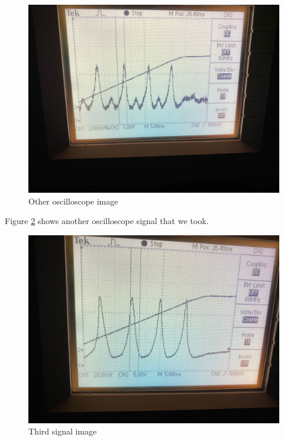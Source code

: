 \documentclass{article}
\begin{document}
\begin{figure}[h!]
\includegraphics[width=\textwidth]{oszilloskopbild_mit_eigenmoden_vom_laser.jpg}
\caption{Other oscilloscope image}
\label{Eigenmoden_laser}
\end{figure}

Figure \ref{Osz2} shows another oscilloscope signal that we took.
\begin{figure}[h!]
\includegraphics[width=\textwidth]{oszilloskopbild 2.jpg}
\caption{Third signal image}
\label{Osz2}
\end{figure}
\end{document}
